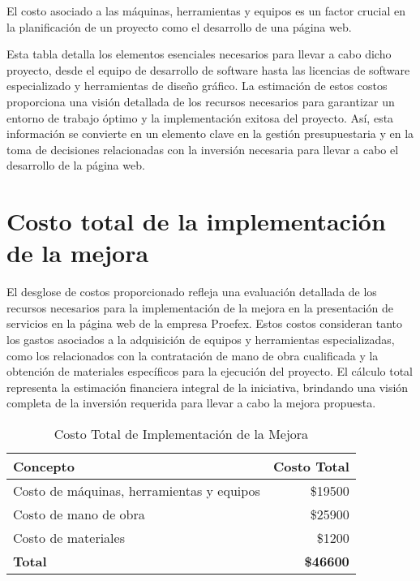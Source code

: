 El costo asociado a las máquinas, herramientas y equipos es un factor crucial en la planificación de un proyecto como el desarrollo de una página web.

Esta tabla detalla los elementos esenciales necesarios para llevar a cabo dicho proyecto, desde el equipo de desarrollo de software hasta las licencias de software especializado y herramientas de diseño gráfico. La estimación de estos costos proporciona una visión detallada de los recursos necesarios para garantizar un entorno de trabajo óptimo y la implementación exitosa del proyecto. Así, esta información se convierte en un elemento clave en la gestión presupuestaria y en la toma de decisiones relacionadas con la inversión necesaria para llevar a cabo el desarrollo de la página web.

\section{Costo total de la implementación de la mejora}

El desglose de costos proporcionado refleja una evaluación detallada de los recursos necesarios para la implementación de la mejora en la presentación de servicios en la página web de la empresa Proefex. Estos costos consideran tanto los gastos asociados a la adquisición de equipos y herramientas especializadas, como los relacionados con la contratación de mano de obra cualificada y la obtención de materiales específicos para la ejecución del proyecto. El cálculo total representa la estimación financiera integral de la iniciativa, brindando una visión completa de la inversión requerida para llevar a cabo la mejora propuesta.

\begin{table}[!ht]
\centering
\begin{tabular}{|l|r|}
\hline
\textbf{Concepto} & \textbf{Costo Total} \\ \hline
Costo de máquinas, herramientas y equipos & \$19500 \\ \hline
Costo de mano de obra & \$25900 \\ \hline
Costo de materiales & \$1200 \\ \hline
\textbf{Total} & \textbf{\$46600} \\ \hline
\end{tabular}
\caption{Costo Total de Implementación de la Mejora}
\end{table}

